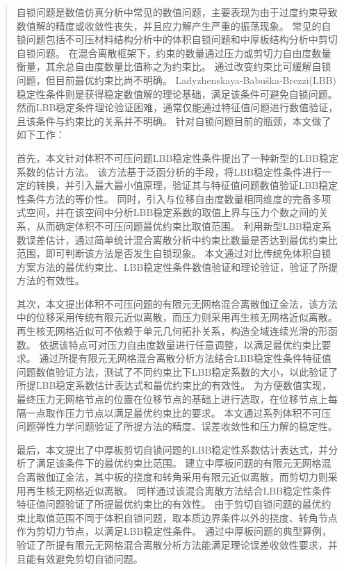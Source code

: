 
\begin{abstract}
    自锁问题是数值仿真分析中常见的数值问题，主要表现为由于过度约束导致数值解的精度或收敛性丧失，并且应力解产生严重的振荡现象。
    常见的自锁问题包括不可压材料结构分析中的体积自锁问题和中厚板结构分析中剪切自锁问题。
    在混合离散框架下，约束的数量通过压力或剪切力自由度数量衡量，其余总自由度数量比值称之为约束比。
    通过改变约束比可缓解自锁问题，但目前最优约束比尚不明确。
    Ladyzhenskaya-Babuška-Brezzi(LBB)稳定性条件则是获得稳定数值解的理论基础，满足该条件可避免自锁问题。
    然而LBB稳定条件理论验证困难，通常仅能通过特征值问题进行数值验证，且该条件与约束比的关系并不明确。
    针对自锁问题目前的瓶颈，本文做了如下工作：
    
    首先，本文针对体积不可压问题LBB稳定性条件提出了一种新型的LBB稳定系数的估计方法。
    该方法基于泛函分析的手段，将LBB稳定性条件进行一定的转换，并引入最大最小值原理，验证其与特征值问题数值验证LBB稳定性条件方法的等价性。
    同时，引入与位移自由度数量相同维度的完备多项式空间，并在该空间中分析LBB稳定系数的取值上界与压力个数之间的关系，从而确定体积不可压问题最优约束比取值范围。
    利用新型LBB稳定系数误差估计，通过简单统计混合离散分析中约束比数量是否达到最优约束比范围，即可判断该方法是否发生自锁现象。
    本文通过对比传统免体积自锁方案方法的最优约束比、LBB稳定性条件数值验证和理论验证，验证了所提方法的有效性。
    
    其次，本文提出体积不可压问题的有限元无网格混合离散伽辽金法，该方法中的位移采用传统有限元近似离散，而压力则采用再生核无网格近似离散。
    再生核无网格近似可不依赖于单元几何拓扑关系，构造全域连续光滑的形函数。
    依据该特点可对压力自由度数量进行任意调整，以满足最优约束比要求。
    通过所提有限元无网格混合离散分析方法结合LBB稳定性条件特征值问题数值验证方法，测试了不同约束比下LBB稳定系数的大小，以此验证了所提LBB稳定系数估计表达式和最优约束比的有效性。
    为方便数值实现，最终压力无网格节点的位置在位移节点的基础上进行选取，在位移节点上每隔一点取作压力节点以满足最优约束比的要求。
    本文通过系列体积不可压问题弹性力学问题验证了所提方法的精度、误差收敛性和压力解的稳定性。
    
    最后，本文提出了中厚板剪切自锁问题的LBB稳定性系数估计表达式，并分析了满足该条件下的最优约束比范围。
    建立中厚板问题的有限元无网格混合离散伽辽金法，其中板的挠度和转角采用有限元近似离散，而剪切力则采用再生核无网格近似离散。
    同样通过该混合离散方法结合LBB稳定性条件特征值问题验证了所提最优约束比的有效性。
    由于剪切自锁问题的最优约束比取值范围不同于体积自锁问题，取本质边界条件以外的挠度、转角节点作为剪切力节点，以满足LBB稳定性条件。
    通过中厚板问题的典型算例，验证了所提有限元无网格混合离散分析方法能满足理论误差收敛性要求，并且能有效避免剪切自锁问题。
    
    \end{abstract}
    
